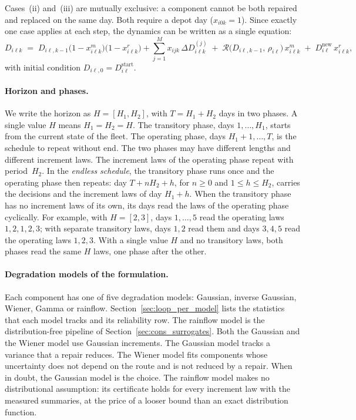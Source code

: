 \documentclass[11pt,a4paper]{article}
\theoremstyle{plain}
\theoremstyle{definition}
\theoremstyle{remark}
\begin{document}
Cases~(ii) and~(iii) are mutually exclusive: a component cannot be both repaired and replaced on the same day.
Both require a depot day ($x_{i0k}=1$).
Since exactly one case applies at each step, the dynamics can be written as a single equation:
\begin{equation}\label{eq:dyn_full}
  D_{i\ell k} \;=\;
    D_{i\ell,k-1}\bigl(1 - x^m_{i\ell k}\bigr)\bigl(1 - x^r_{i\ell k}\bigr) + \sum_{j=1}^{M} x_{ijk}\,\Delta D_{i\ell k}^{(j)}
    \;+\; \mathcal{R}\!\bigl(D_{i\ell,k-1},\,\rho_{i\ell}\bigr)\,x^m_{i\ell k}
    \;+\; D^{\mathrm{new}}_{i\ell}\,x^r_{i\ell k},
\end{equation}
with initial condition $D_{i\ell,0} = D^{\mathrm{start}}_{i\ell}$.

\paragraph{Horizon and phases.}
We write the horizon as $H = [H_1, H_2]$, with $T = H_1 + H_2$ days in two phases.
A single value $H$ means $H_1 = H_2 = H$.
The transitory phase, days $1,\ldots,H_1$, starts from the current state of the fleet.
The operating phase, days $H_1+1,\ldots,T$, is the schedule to repeat without end.
The two phases may have different lengths and different increment laws.
The increment laws of the operating phase repeat with period~$H_2$.
In the \emph{endless schedule}, the transitory phase runs once and the operating phase then repeats: day $T + nH_2 + h$, for $n \ge 0$ and $1 \le h \le H_2$, carries the decisions and the increment laws of day $H_1 + h$.
When the transitory phase has no increment laws of its own, its days read the laws of the operating phase cyclically.
For example, with $H = [2, 3]$, days $1,\ldots,5$ read the operating laws $1, 2, 1, 2, 3$; with separate transitory laws, days $1, 2$ read them and days $3, 4, 5$ read the operating laws $1, 2, 3$.
With a single value $H$ and no transitory laws, both phases read the same $H$ laws, one phase after the other.

\paragraph{Degradation models of the formulation.}
Each component has one of five degradation models: Gaussian, inverse Gaussian, Wiener, Gamma or rainflow.
Section~\ref{sec:loop_per_model} lists the statistics that each model tracks and its reliability row.
The rainflow model is the distribution-free pipeline of Section~\ref{sec:cons_surrogates}.
Both the Gaussian and the Wiener model use Gaussian increments.
The Gaussian model tracks a variance that a repair reduces.
The Wiener model fits components whose uncertainty does not depend on the route and is not reduced by a repair.
When in doubt, the Gaussian model is the choice.
The rainflow model makes no distributional assumption: its certificate holds for every increment law with the measured summaries, at the price of a looser bound than an exact distribution function.
\end{document}
